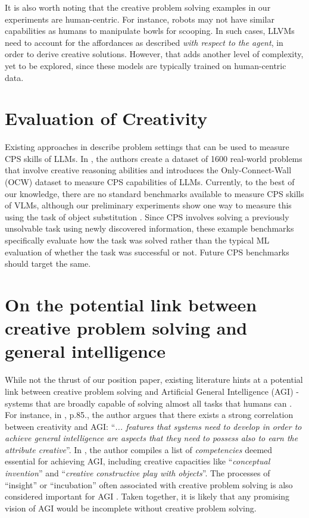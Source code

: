 It is also worth noting that the creative problem solving examples in our experiments are human-centric. For instance, robots may not have similar capabilities as humans to manipulate bowls for scooping. In such cases, LLVMs need to account for the affordances as described \textit{with respect to the agent}, in order to derive creative solutions. However, that adds another level of complexity, yet to be explored, since these models are typically trained on human-centric data.

\section{Evaluation of Creativity}
Existing approaches in \cite{tian2023macgyver,naeini2023large} describe problem settings that can be used to measure CPS skills of LLMs. In \cite{tian2023macgyver}, the authors create a dataset of 1600 real-world problems that involve creative reasoning abilities and \cite{naeini2023large} introduces the Only-Connect-Wall (OCW) dataset to measure CPS capabilities of LLMs. Currently, to the best of our knowledge, there are no standard benchmarks available to measure CPS skills of VLMs, although our preliminary experiments show one way to measure this using the task of object substitution \cite{oltecteanu2016object}. Since CPS involves solving a previously unsolvable task using newly discovered information, these example benchmarks specifically evaluate how the task was solved rather than the typical ML evaluation of whether the task was successful or not. Future CPS benchmarks should target the same.

\section{On the potential link between creative problem solving and general intelligence}
While not the thrust of our position paper, existing literature hints at a potential link between creative problem solving and Artificial General Intelligence (AGI) - systems that are broadly capable of solving almost all tasks that humans can \cite{shevlin2019limits}. For instance, in \cite{moruzzi2020artificial},  p.85., the author argues that there exists a strong correlation between creativity and AGI: ``\textit{... features that systems need to develop in order to achieve general intelligence are aspects that they need to possess also to earn the attribute creative}''. In \cite{goertzel2014artificial}, the author compiles a list of \textit{competencies} deemed essential for achieving AGI, including creative capacities like ``\textit{conceptual invention}'' and ``\textit{creative constructive play with objects}''. The processes of ``insight'' or ``incubation'' often associated with creative problem solving \cite{helie2010incubation,gilhooly2016incubation} is also considered important for AGI \cite{ventura2014can}. Taken together, it is likely that any promising vision of AGI would be incomplete without creative problem solving.

